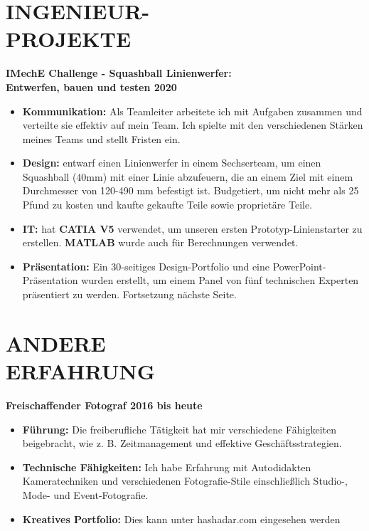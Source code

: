 \documentclass[margin, 10pt]{res} %
\begin{document}
\begin{resume}

\section{INGENIEUR- \\ PROJEKTE}

\textbf{IMechE Challenge - Squashball Linienwerfer: \\Entwerfen, bauen und testen \hfill 2020}
\\
\begin{itemize}
  \item \textbf{Kommunikation:} 
  Als Teamleiter arbeitete ich mit Aufgaben zusammen und verteilte sie effektiv auf mein Team. Ich spielte mit den verschiedenen Stärken meines Teams und stellt Fristen ein.  
  \item \textbf{Design:} entwarf einen Linienwerfer in einem Sechserteam, um einen Squashball (40\si{\milli \meter}) mit einer Linie abzufeuern, die an einem Ziel mit einem Durchmesser von 120-490 \si{\milli \meter} befestigt ist. Budgetiert, um nicht mehr als 25 Pfund zu kosten und kaufte gekaufte Teile sowie proprietäre Teile.
  \item \textbf{IT:} hat \textbf{CATIA V5} verwendet, um unseren ersten Prototyp-Linienstarter zu erstellen. \textbf{MATLAB} wurde auch für Berechnungen verwendet.
  \item \textbf{Präsentation:} Ein 30-seitiges Design-Portfolio und eine PowerPoint-Präsentation wurden erstellt, um einem Panel von fünf technischen Experten präsentiert zu werden. Fortsetzung nächste Seite.
\end{itemize}
 
 
\section{ANDERE \\ ERFAHRUNG}
\textbf{Freischaffender Fotograf \hfill 2016 bis heute}
\\
\begin{itemize}
  \item \textbf{Führung:} Die freiberufliche Tätigkeit hat mir verschiedene Fähigkeiten beigebracht, wie z. B. Zeitmanagement und effektive Geschäftsstrategien.
  \item \textbf{Technische Fähigkeiten:} Ich habe Erfahrung mit Autodidakten Kameratechniken und verschiedenen Fotografie-Stile einschließlich Studio-, Mode- und Event-Fotografie.
  \item \textbf{Kreatives Portfolio:} Dies kann unter hashadar.com eingesehen werden
\end{itemize}


\end{resume}
\end{document}

